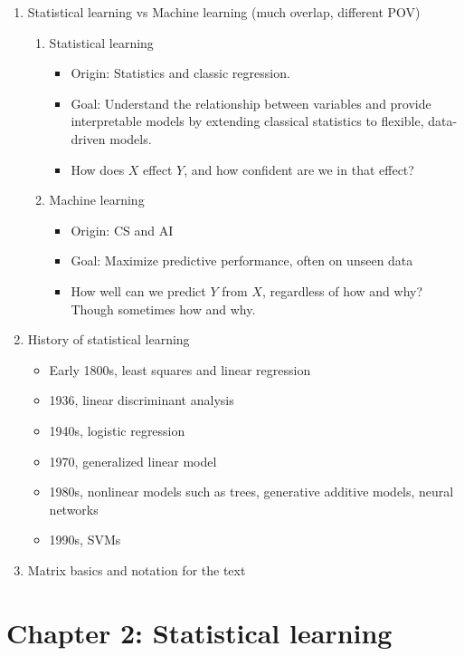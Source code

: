 \documentclass{article}
\begin{document}
\begin{enumerate}
\item Statistical learning vs Machine learning (much overlap, different POV)
\begin{enumerate}
\item Statistical learning
\begin{itemize}
\item Origin: Statistics and classic regression.
\item Goal: Understand the relationship between variables and provide interpretable models by extending classical statistics to flexible, data-driven models.
\item How does $X$ effect $Y$, and how confident are we in that effect?
\end{itemize}
\item Machine learning
\begin{itemize}
\item Origin: CS and AI
\item Goal: Maximize predictive performance, often on unseen data
\item How well can we predict $Y$ from $X$, regardless of how and why? Though sometimes how and why.
\end{itemize}
\end{enumerate}

\item History of statistical learning
\begin{itemize}
\item Early 1800s, least squares and linear regression
\item 1936, linear discriminant analysis
\item 1940s, logistic regression
\item 1970, generalized linear model
\item 1980s, nonlinear models such as trees, generative additive models, neural networks
\item 1990s, SVMs
\end{itemize}

\item Matrix basics and notation for the text
\end{enumerate}


\section*{Chapter 2: Statistical learning} 
\end{document}

